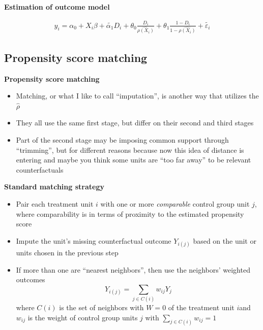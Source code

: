 \documentclass[notes=show]{beamer}
\begin{document}
\begin{frame}[plain]
\begin{center}
\textbf{Estimation of outcome model}
\end{center}

\begin{eqnarray*}
y_i = \alpha_0 + X_i\beta + \tilde{\alpha_1} D_i + \theta_0 \frac{D_i}{\widehat{\rho (X_i)}} + \theta_1 \frac{1-D_i}{1- \widehat{\rho (X_i)}} + \tilde{\varepsilon_i}
\end{eqnarray*}

\end{frame}

\subsection{Propensity score matching}

\begin{frame}

	\begin{center}
	\textbf{Propensity score matching}
	\end{center}
	
	\begin{itemize}
	\item Matching, or what I like to call ``imputation'', is another way that utilizes the $\widehat{\rho}$
	\item They all use the same first stage, but differ on their second and third stages
	\item Part of the second stage may be imposing common support through ``trimming'', but for different reasons because now this idea of distance is entering and maybe you think some units are ``too far away'' to be relevant counterfactuals
	\end{itemize}

\end{frame}




\begin{frame}[plain]

	\begin{center}
	\textbf{Standard matching strategy}
	\end{center}
	
	\begin{itemize}
	\item Pair each treatment unit $i$ with one or more \emph{comparable} control group unit $j$, where comparability is in terms of proximity to the estimated propensity score
	\item Impute the unit's missing counterfactual outcome $Y_{i(j)}$ based on the unit or units chosen in the previous step
	\item If more than one are ``nearest neighbors'', then use the neighbors' weighted outcomes  $$Y_{i(j)} = \sum_{j \in C(i)} w_{ij}Y_j$$ where $C(i)$ is the set of neighbors with $W=0$ of the treatment unit $i$and $w_{ij}$ is the weight of control group units $j$ with $\sum_{j \in C(i)} w_{ij} = 1$
	\end{itemize}
\end{frame}
\end{document}

